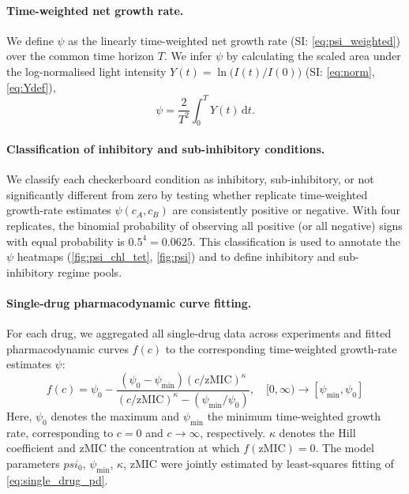 \paragraph{Time-weighted net growth rate.}
We define \(\psi\) as the linearly time-weighted net growth rate (SI: \autoref{eq:psi_weighted}) over the common time horizon \(T\).
We infer \(\psi\) by calculating the scaled area under the log-normalised light intensity \(Y(t)=\ln\!\big(I(t)/I(0)\big)\) (SI: \autoref{eq:norm}, \autoref{eq:Ydef}),
\begin{equation}
  \psi
  =
  \frac{2}{T^{2}} \int_{0}^{T}Y(t)\,\mathrm{d}t.
  \label{eq:effective_psi}
\end{equation}

\paragraph{Classification of inhibitory and sub-inhibitory conditions.}
We classify each checkerboard condition as inhibitory, sub-inhibitory, or not significantly different from zero by testing whether replicate time-weighted growth-rate estimates \(\psi(c_A,c_B)\) are consistently positive or negative.
With four replicates, the binomial probability of observing all positive (or all negative) signs with equal probability is \(0.5^4=0.0625\).
This classification is used to annotate the \(\psi\) heatmaps (\autoref{fig:psi_chl_tet}, \autoref{fig:psi}) and to define inhibitory and sub-inhibitory regime pools.

\paragraph{Single-drug pharmacodynamic curve fitting.}
For each drug, we aggregated all single-drug data across experiments and fitted pharmacodynamic curves \(f(c)\) to the corresponding time-weighted growth-rate estimates \(\psi\):
\begin{equation}
  f(c) = \psi_{0} - \frac{(\psi_{0}-\psi_{\min})(c/\mathrm{zMIC})^{\kappa}} {(c/\mathrm{zMIC})^{\kappa}-(\psi_{\min}/\psi_{0})}, \quad [0,\infty)\rightarrow[\psi_{\min},\psi_{0}]
  \label{eq:single_drug_pd}
\end{equation}
Here, \(\psi_{0}\) denotes the maximum and \(\psi_{\min}\) the minimum time-weighted growth rate, corresponding to \(c=0\) and \(c\to\infty\), respectively.
\(\kappa\) denotes the Hill coefficient and \(\mathrm{zMIC}\) the concentration at which \(f(\mathrm{zMIC})=0\).
The model parameters $psi_{0}$, $\psi_{\min}$, $\kappa$, $\mathrm{zMIC}$ were jointly estimated by least-squares fitting of \autoref{eq:single_drug_pd}.

